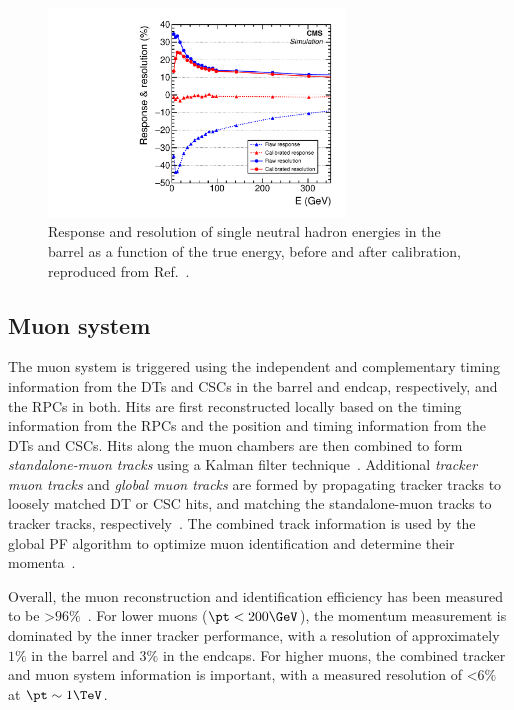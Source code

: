 \begin{figure}[ht]
    \centering
    \includegraphics[width=0.7\textwidth]{figures/02-CMS/cms/components/hadron_response.pdf}
    \caption{Response and resolution of single neutral hadron energies in the barrel as a function of the true energy, before and after calibration, reproduced from Ref.~\cite{CMS:2017yfk}.}
    \label{fig:02_cms_hcal_response}
\end{figure}

\subsection{Muon system}

The muon system is triggered using the independent and complementary timing information from the DTs and CSCs in the barrel and endcap, respectively, and the RPCs in both.
Hits are first reconstructed locally based on the timing information from the RPCs and the position and timing information from the DTs and CSCs.
Hits along the muon chambers are then combined to form \textit{standalone-muon tracks} using a Kalman filter technique~\cite{Fruhwirth:1987fm}.
Additional \textit{tracker muon tracks} and \textit{global muon tracks} are formed by propagating tracker tracks to loosely matched DT or CSC hits, and matching the standalone-muon tracks to tracker tracks, respectively~\cite{CMS:2018rym}.
The combined track information is used by the global PF algorithm to optimize muon identification and determine their momenta~\cite{CMS:2017yfk}.

Overall, the muon reconstruction and identification efficiency has been measured to be >$96\%$~\cite{CMS:2018rym}.
For lower \pt muons ($\pt < 200\GeV$), the momentum measurement is dominated by the inner tracker performance, with a resolution of approximately $1\%$ in the barrel and $3\%$ in the endcaps.
For higher \pt muons, the combined tracker and muon system information is important, with a measured resolution of <$6\%$ at $\pt \sim 1\TeV$.

